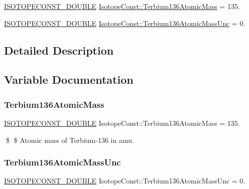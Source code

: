 \begin{DoxyCompactItemize}
\item 
\mbox{\hyperlink{group___isotope_const-_macros_ga8f45a7272ce02c0b4c65c44636ed719a}{I\+S\+O\+T\+O\+P\+E\+C\+O\+N\+S\+T\+\_\+\+D\+O\+U\+B\+LE}} \mbox{\hyperlink{group___isotope_const-_terbium-_tb136_gaa6215e9ff746dfd88cff81c5e19610fb}{Isotope\+Const\+::\+Terbium136\+Atomic\+Mass}} = 135.
\item 
\mbox{\hyperlink{group___isotope_const-_macros_ga8f45a7272ce02c0b4c65c44636ed719a}{I\+S\+O\+T\+O\+P\+E\+C\+O\+N\+S\+T\+\_\+\+D\+O\+U\+B\+LE}} \mbox{\hyperlink{group___isotope_const-_terbium-_tb136_ga3953ad4a1af7e2e32e3b071fb598c124}{Isotope\+Const\+::\+Terbium136\+Atomic\+Mass\+Unc}} = 0.
\end{DoxyCompactItemize}


\subsection{Detailed Description}


\subsection{Variable Documentation}
\mbox{\label{group___isotope_const-_terbium-_tb136_gaa6215e9ff746dfd88cff81c5e19610fb}} 
\subsubsection{\texorpdfstring{Terbium136\+Atomic\+Mass}{Terbium136AtomicMass}}
{\footnotesize\ttfamily \mbox{\hyperlink{group___isotope_const-_macros_ga8f45a7272ce02c0b4c65c44636ed719a}{I\+S\+O\+T\+O\+P\+E\+C\+O\+N\+S\+T\+\_\+\+D\+O\+U\+B\+LE}} Isotope\+Const\+::\+Terbium136\+Atomic\+Mass = 135.}

\$ \$ Atomic mass of Terbium-\/136 in amu. \mbox{\label{group___isotope_const-_terbium-_tb136_ga3953ad4a1af7e2e32e3b071fb598c124}} 
\subsubsection{\texorpdfstring{Terbium136\+Atomic\+Mass\+Unc}{Terbium136AtomicMassUnc}}
{\footnotesize\ttfamily \mbox{\hyperlink{group___isotope_const-_macros_ga8f45a7272ce02c0b4c65c44636ed719a}{I\+S\+O\+T\+O\+P\+E\+C\+O\+N\+S\+T\+\_\+\+D\+O\+U\+B\+LE}} Isotope\+Const\+::\+Terbium136\+Atomic\+Mass\+Unc = 0.}

